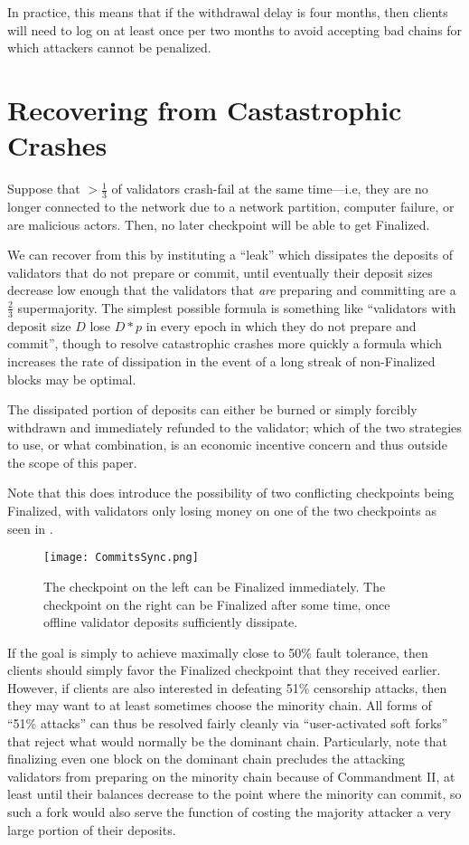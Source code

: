 \documentclass[12pt]{article}
\begin{document}
In practice, this means that if the withdrawal delay is four months, then clients will need to log on at least once per two months to avoid accepting bad chains for which attackers cannot be penalized.

\section{Recovering from Castastrophic Crashes}
\label{sect:leak}

Suppose that $>\frac{1}{3}$ of validators crash-fail at the same time---i.e, they are no longer connected to the network due to a network partition, computer failure, or are malicious actors. Then, no later checkpoint will be able to get Finalized.

We can recover from this by instituting a ``leak'' which dissipates the deposits of validators that do not prepare or commit, until eventually their deposit sizes decrease low enough that the validators that \textit{are} preparing and committing are a $\frac{2}{3}$ supermajority. The simplest possible formula is something like ``validators with deposit size $D$ lose $D * p$ in every epoch in which they do not prepare and commit'', though to resolve catastrophic crashes more quickly a formula which increases the rate of dissipation in the event of a long streak of non-Finalized blocks may be optimal.

The dissipated portion of deposits can either be burned or simply forcibly withdrawn and immediately refunded to the validator; which of the two strategies to use, or what combination, is an economic incentive concern and thus outside the scope of this paper.

Note that this does introduce the possibility of two conflicting checkpoints being Finalized, with validators only losing money on one of the two checkpoints as seen in .

\begin{figure}[h!tb]
\centering
\texttt{[image: CommitsSync.png]}
\caption{The checkpoint on the left can be Finalized immediately. The checkpoint on the right can be Finalized after some time, once offline validator deposits sufficiently dissipate.}
\label{fig:commitsync}
\end{figure}

If the goal is simply to achieve maximally close to 50\% fault tolerance, then clients should simply favor the Finalized checkpoint that they received earlier. However, if clients are also interested in defeating 51\% censorship attacks, then they may want to at least sometimes choose the minority chain. All forms of ``51\% attacks'' can thus be resolved fairly cleanly via ``user-activated soft forks'' that reject what would normally be the dominant chain. Particularly, note that finalizing even one block on the dominant chain precludes the attacking validators from preparing on the minority chain because of Commandment II, at least until their balances decrease to the point where the minority can commit, so such a fork would also serve the function of costing the majority attacker a very large portion of their deposits.
\end{document}
